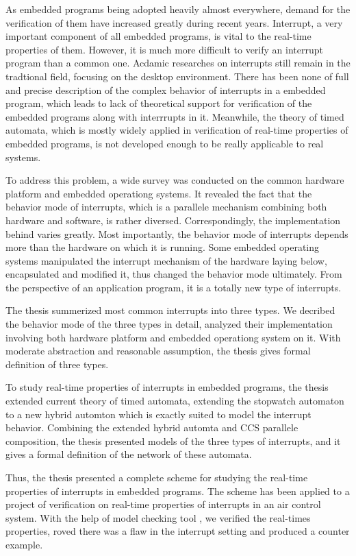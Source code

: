 \begin{eabstract} 
   As embedded programs being adopted heavily almost everywhere, demand
   for the verification of them have increased greatly during recent years.
   Interrupt, a very important component of all embedded programs, is vital
   to the real-time properties of them. However, it is much more difficult
   to verify an interrupt program than a common one. Acdamic researches
   on interrupts still remain in the tradtional field, focusing on the desktop
   environment. There has been none of full and precise description of the
   complex behavior of interrupts in a embedded program, which leads to
   lack of theoretical support for verification of the embedded programs
   along with interrrupts in it. Meanwhile, the theory of timed automata,
   which is mostly widely applied in verification of real-time properties
   of embedded programs, is not developed enough to be really applicable to
   real systems. 
   
   To address this problem, a wide survey was conducted on the common hardware
   platform and embedded operationg systems. It revealed the fact 
   that the behavior mode of interrupts, which is a parallele mechanism combining
   both hardware and software, is rather diversed. Correspondingly, the 
   implementation behind varies greatly. Most importantly, the behavior mode
   of interrupts depends more than the hardware on which it is running. Some
   embedded operating systems manipulated the interrupt mechanism of the hardware
   laying below, encapsulated and modified it, thus changed the behavior mode
   ultimately. From the perspective of an application program, it is a totally
   new type of interrupts.
    
   The thesis summerized most common interrupts into three types. We decribed
   the behavior mode of the three types in detail, analyzed their implementation
   involving both hardware platform and embedded operationg system on it. With
   moderate abstraction and reasonable assumption, the thesis gives formal
   definition of three types.
   
   To study real-time properties of interrupts in embedded programs, the thesis
   extended current theory of timed automata, extending the stopwatch automaton
   to a new hybrid automton which is exactly suited to model the interrupt
   behavior. Combining the extended hybrid automta and CCS parallele composition,
   the thesis presented models of the three types of interrupts, and it gives
   a formal definition of the network of these automata. 
   
   Thus, the thesis presented a complete scheme for studying the real-time 
   properties of interrupts in embedded programs. The scheme has been applied 
   to a project of verification on real-time properties of interrupts in an 
   air control system. With the help of model checking tool \uppaal, we 
   verified the real-times properties, roved there was a flaw in the interrupt 
   setting and produced a counter example.
\end{eabstract}

